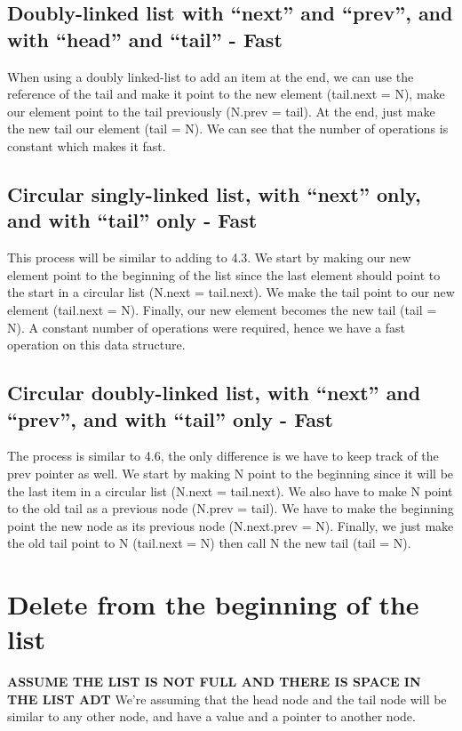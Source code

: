 \documentclass{article}
\begin{document}
\subsection{Doubly-linked list with “next” and “prev”, and with “head” and “tail” - Fast}
When using a doubly linked-list to add an item at the end, we can use the reference of the tail and make it point to the new element (tail.next = N), make our element point to the tail previously (N.prev = tail). At the end, just make the new tail our element (tail = N). We can see that the number of operations is constant which makes it fast.

\subsection{Circular singly-linked list, with “next” only, and with “tail” only - Fast}
This process will be similar to adding to 4.3. We start by making our new element point to the beginning of the list since the last element should point to the start in a circular list (N.next = tail.next). We make the tail point to our new element (tail.next = N). Finally, our new element becomes the new tail (tail = N). A constant number of operations were required, hence we have a fast operation on this data structure.

\subsection{Circular doubly-linked list, with “next” and “prev”, and with “tail” only - Fast}
The process is similar to 4.6, the only difference is we have to keep track of the prev pointer as well. We start by making N point to the beginning since it will be the last item in a circular list (N.next = tail.next). We also have to make N point to the old tail as a previous node (N.prev = tail). We have to make the beginning point the new node as its previous node (N.next.prev = N). Finally, we just make the old tail point to N (tail.next = N) then call N the new tail (tail = N).



\section{Delete from the beginning of the list}
\textbf{ASSUME THE LIST IS NOT FULL AND THERE IS SPACE IN THE LIST ADT}
We're assuming that the head node and the tail node will be similar to any other node, and have a value and a pointer to another node.
\end{document}
